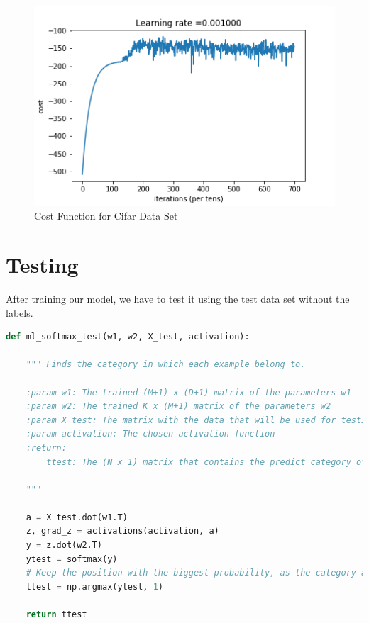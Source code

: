 \documentclass[11pt]{article}
\begin{document}
\begin{figure}[ht!]
  \includegraphics[width=\linewidth]{./Project_1_files/cifar_cost_function.png}
  \caption{Cost Function for Cifar Data Set}
  \label{fig:cost}
\end{figure}


\newpage


\section{Testing}
After training our model, we have to test it using the test data set without the labels. \\

\begin{lstlisting}[language = Python]
def ml_softmax_test(w1, w2, X_test, activation):
    
    """ Finds the category in which each example belong to.
    
    :param w1: The trained (M+1) x (D+1) matrix of the parameters w1
    :param w2: The trained K x (M+1) matrix of the parameters w2
    :param X_test: The matrix with the data that will be used for testing
    :param activation: The chosen activation function
    :return:
        ttest: The (N x 1) matrix that contains the predict category of each example
    
    """
    
    a = X_test.dot(w1.T)
    z, grad_z = activations(activation, a)
    y = z.dot(w2.T)
    ytest = softmax(y)
    # Keep the position with the biggest probability, as the category a test example belongs to
    ttest = np.argmax(ytest, 1)
    
    return ttest
\end{lstlisting}
\end{document}
